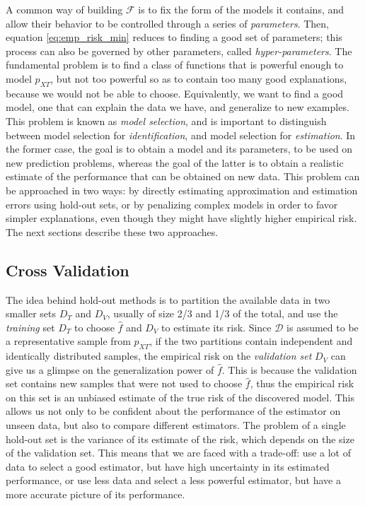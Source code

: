 \documentclass[a4paper,11pt]{kth-mag}
\begin{document}
A common way of building $\mathcal{F}$ is to fix the form of the models it contains, and allow their behavior to be controlled through a series of \emph{parameters}. Then, equation \ref{eq:emp_risk_min} reduces to finding a good set of parameters; this process can also be governed by other parameters, called \emph{hyper-parameters}. The fundamental problem is to find a class of functions that is powerful enough to model $p_{XT}$, but not too powerful so as to contain too many good explanations, because we would not be able to choose. Equivalently, we want to find a good model, one that can explain the data we have, and generalize to new examples. This problem is known as \emph{model selection}, and is important to distinguish between model selection for \emph{identification}, and model selection for \emph{estimation}. In the former case, the goal is to obtain a model and its parameters, to be used on new prediction problems, whereas the goal of the latter is to obtain a realistic estimate of the performance that can be obtained on new data. This problem can be approached in two ways: by directly estimating approximation and estimation errors using hold-out sets, or by penalizing complex models in order to favor simpler explanations, even though they might have slightly higher empirical risk. The next sections describe these two approaches.


\subsection{Cross Validation}
\label{sec:cv}
The idea behind hold-out methods is to partition the available data in two smaller sets $D_T$ and $D_V$, usually of size 2/3 and 1/3 of the total, and use the \emph{training} set $D_T$ to choose $\hat{f}$ and $D_V$ to estimate its risk. Since $\mathcal{D}$ is assumed to be a representative sample from $p_{XT}$, if the two partitions contain independent and identically distributed samples, the empirical risk on the \emph{validation set} $D_V$ can give us a glimpse on the generalization power of $\hat{f}$. This is because the validation set contains new samples that were not used to choose $\hat{f}$, thus the empirical risk on this set is an unbiased estimate of the true risk of the discovered model. This allows us not only to be confident about the performance of the estimator on unseen data, but also to compare different estimators. The problem of a single hold-out set is the variance of its estimate of the risk, which depends on the size of the validation set. This means that we are faced with a trade-off: use a lot of data to select a good estimator, but have high uncertainty in its estimated performance, or use less data and select a less powerful estimator, but have a more accurate picture of its performance.
\end{document}
